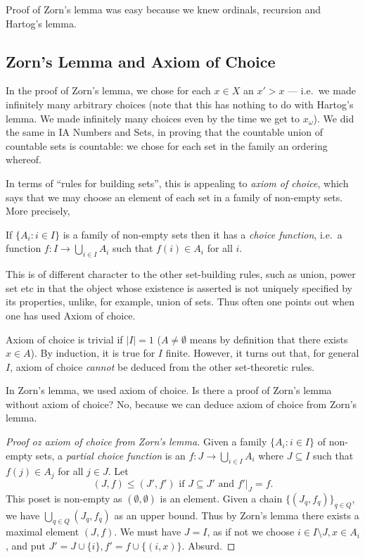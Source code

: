 \documentclass[a4paper]{article}
\begin{document}
\begin{remark}
  Proof of Zorn's lemma was easy because we knew ordinals, recursion  and Hartog's lemma.
\end{remark}

\subsection{Zorn's Lemma and Axiom of Choice}

In the proof of Zorn's lemma, we chose for each \(x \in X\) an \(x' > x\) --- i.e.\ we made infinitely many arbitrary choices (note that this has nothing to do with Hartog's lemma. We made infinitely many choices even by the time we get to \(x_\omega\)). We did the same in IA Numbers and Sets, in proving that the countable union of countable sets is countable: we chose for each set in the family an ordering whereof.

In terms of ``rules for building sets'', this is appealing to \emph{axiom of choice}, which says that we may choose an element of each set in a family of non-empty sets. More precisely,

\begin{axiom}
  If \(\{A_i: i \in I\}\) is a family of non-empty sets then it has a \emph{choice function}, i.e.\ a function \(f: I \to \bigcup_{i \in I} A_i\) such that \(f(i) \in A_i\) for all \(i\).
\end{axiom}

This is of different character to the other set-building rules, such as union, power set etc in that the object whose existence is asserted is not uniquely specified by its properties, unlike, for example, union of sets. Thus often one points out when one has used Axiom of choice.

\begin{remark}
  Axiom of choice is trivial if \(|I| = 1\) (\(A \neq \emptyset\) means by definition that there exists \(x \in A\)). By induction, it is true for \(I\) finite. However, it turns out that, for general \(I\), axiom of choice \emph{cannot} be deduced from the other set-theoretic rules.
\end{remark}

In Zorn's lemma, we used axiom of choice. Is there a proof of Zorn's lemma without axiom of choice? No, because we can deduce axiom of choice from Zorn's lemma.

\begin{proof}[Proof oz axiom of choice from Zorn's lemma]
  Given a family \(\{A_i: i \in I\}\) of non-empty sets, a \emph{partial choice function} is an \(f: J \to \bigcup_{i \in I} A_i\) where \(J \subseteq I\) such that \(f(j) \in A_j\) for all \(j \in J\). Let
  \[
    (J, f) \leq (J', f') \text{ if } J \subseteq J' \text{ and } f'|_J = f.
  \]
  This poset is non-empty as \((\emptyset, \emptyset)\) is an element. Given a chain \(\{(J_q, f_q)\}_{q \in Q}\), we have \(\bigcup_{q \in Q} (J_q, f_q)\) as an upper bound. Thus by Zorn's lemma there exists a maximal element \((J, f)\). We must have \(J = I\), as if not we choose \(i \in I \setminus J, x \in A_i\), and put \(J' = J \cup \{i\}, f' = f \cup \{(i, x)\}\). Absurd.
\end{proof}
\end{document}

